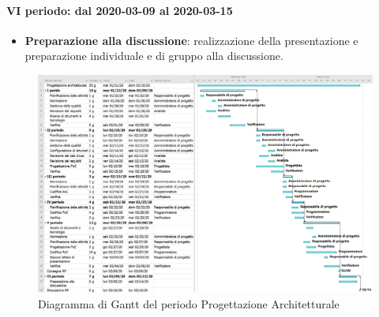 \paragraph*{VI periodo: dal 2020-03-09 al 2020-03-15}
\begin{itemize}
	\item \textbf{Preparazione alla discussione}: realizzazione della presentazione e preparazione individuale e di gruppo alla discussione.
\end{itemize}

\begin{landscape}
	\begin{figure}
		\centering
		\includegraphics[scale=0.512]{./gantt/Progettazione architetturale.png}
		\caption{Diagramma di Gantt del periodo Progettazione Architetturale}
	\end{figure}
\end{landscape}
\pagebreak


